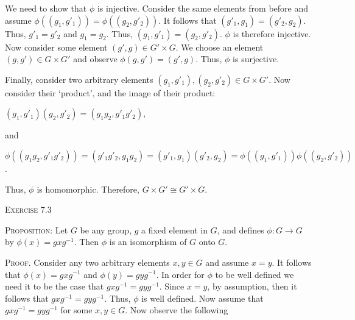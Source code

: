 \documentclass[12pt, a4paper]{article}
\begin{document}
    We need to show that $\phi$ is injective. Consider the same elements from before and assume $\phi((g_1,g'_1))=\phi((g_2,g'_2))$. It follows that $(g'_1,g_1)=(g'_2,g_2)$. Thus, $g'_1=g'_2$ and $g_1=g_2$. Thus, $(g_1,g'_1)=(g_2,g'_2)$. $\phi$ is therefore injective. Now consider some element $(g',g)\in G'\times G$. We choose an element $(g,g')\in G\times G'$ and observe $\phi(g,g')=(g',g)$. Thus, $\phi$ is surjective.\par
    
    Finally, consider two arbitrary elements $(g_1,g'_1),(g_2,g'_2)\in G\times G'$. Now consider their `product', and the image of their product:\par
    
\vspace{4mm}

        \centerline{$(g_1,g'_1)(g_2,g'_2)=(g_1g_2,g'_1g'_2)$,}
        
\vspace{2mm}

    and
    
\vspace{2mm}

        \centerline{$\phi((g_1g_2,g'_1g'_2))=(g'_1g'_2,g_1g_2)=(g'_1,g_1)(g'_2,g_2)=\phi((g_1,g'_1))\phi((g_2,g'_2))$.}
        
\vspace{4mm}

    Thus, $\phi$ is homomorphic. Therefore, $G\times G'\cong G'\times G$.
    
\vspace{4mm}

\begin{flushleft}
    \textsc{Exercise 7.3}
\end{flushleft}

    \textsc{Proposition: }Let $G$ be any group, $g$ a fixed element in $G$, and defines $\phi\colon G\rightarrow G$ by $\phi(x)=gxg^{-1}$. Then $\phi$ is an isomorphism of $G$ onto $G$.
    
\vspace{4mm}

    \textsc{Proof. }Consider any two arbitrary elements $x,y\in G$ and assume $x=y$. It follows that $\phi(x)=gxg^{-1}$ and $\phi(y)=gyg^{-1}$. In order for $\phi$ to be well defined we need it to be the case that $gxg^{-1}=gyg^{-1}$. Since $x=y$, by assumption, then it follows that $gxg^{-1}=gyg^{-1}$. Thus, $\phi$ is well defined. Now assume that $gxg^{-1}=gyg^{-1}$ for some $x,y\in G$. Now observe the following\par
    
\end{document}
